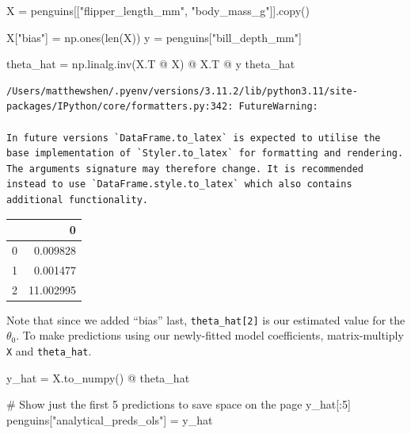 \documentclass[
  letterpaper,
  DIV=11,
  numbers=noendperiod]{scrreprt}
\newenvironment{Shaded}{\begin{snugshade}}{\end{snugshade}}
\newcommand{\BuiltInTok}[1]{\textcolor[rgb]{0.00,0.23,0.31}{#1}}
\newcommand{\CommentTok}[1]{\textcolor[rgb]{0.37,0.37,0.37}{#1}}
\newcommand{\DecValTok}[1]{\textcolor[rgb]{0.68,0.00,0.00}{#1}}
\newcommand{\NormalTok}[1]{\textcolor[rgb]{0.00,0.23,0.31}{#1}}
\newcommand{\OperatorTok}[1]{\textcolor[rgb]{0.37,0.37,0.37}{#1}}
\newcommand{\StringTok}[1]{\textcolor[rgb]{0.13,0.47,0.30}{#1}}
\begin{document}
\begin{Shaded}
\begin{Highlighting}[]
\NormalTok{X }\OperatorTok{=}\NormalTok{ penguins[[}\StringTok{"flipper\_length\_mm"}\NormalTok{, }\StringTok{"body\_mass\_g"}\NormalTok{]].copy()}

\NormalTok{X[}\StringTok{"bias"}\NormalTok{] }\OperatorTok{=}\NormalTok{ np.ones(}\BuiltInTok{len}\NormalTok{(X))}
\NormalTok{y }\OperatorTok{=}\NormalTok{ penguins[}\StringTok{"bill\_depth\_mm"}\NormalTok{]}


\NormalTok{theta\_hat }\OperatorTok{=}\NormalTok{ np.linalg.inv(X.T }\OperatorTok{@}\NormalTok{ X) }\OperatorTok{@}\NormalTok{ X.T }\OperatorTok{@}\NormalTok{ y}
\NormalTok{theta\_hat  }
\end{Highlighting}
\end{Shaded}

\begin{verbatim}
/Users/matthewshen/.pyenv/versions/3.11.2/lib/python3.11/site-packages/IPython/core/formatters.py:342: FutureWarning:

In future versions `DataFrame.to_latex` is expected to utilise the base implementation of `Styler.to_latex` for formatting and rendering. The arguments signature may therefore change. It is recommended instead to use `DataFrame.style.to_latex` which also contains additional functionality.
\end{verbatim}

\begin{tabular}{lr}
\toprule
{} &          0 \\
\midrule
0 &   0.009828 \\
1 &   0.001477 \\
2 &  11.002995 \\
\bottomrule
\end{tabular}

Note that since we added ``bias'' last, \texttt{theta\_hat{[}2{]}} is
our estimated value for the \(\theta_0\). To make predictions using our
newly-fitted model coefficients, matrix-multiply \texttt{X} and
\texttt{theta\_hat}.

\begin{Shaded}
\begin{Highlighting}[]
\NormalTok{y\_hat }\OperatorTok{=}\NormalTok{ X.to\_numpy() }\OperatorTok{@}\NormalTok{ theta\_hat}

\CommentTok{\# Show just the first 5 predictions to save space on the page}
\NormalTok{y\_hat[:}\DecValTok{5}\NormalTok{]}
\NormalTok{penguins[}\StringTok{"analytical\_preds\_ols"}\NormalTok{] }\OperatorTok{=}\NormalTok{ y\_hat}
\end{Highlighting}
\end{Shaded}
\end{document}
